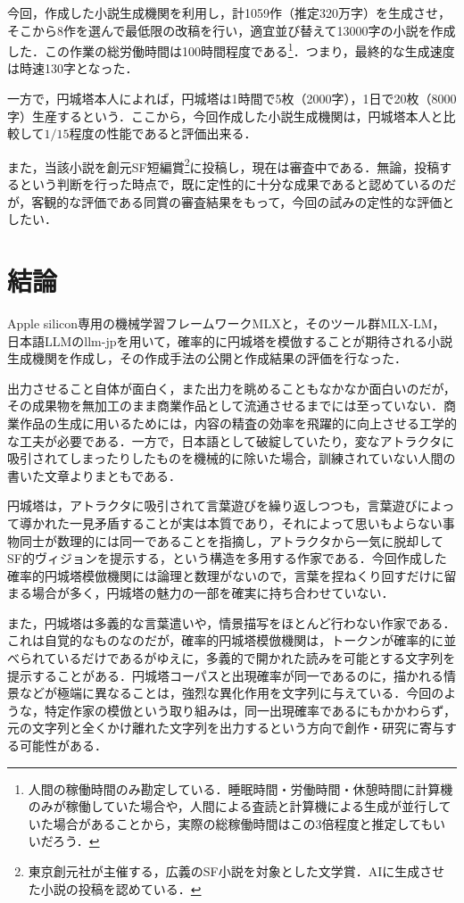 \documentclass[10pt, a5paper, twoside]{jsarticle}
\theoremstyle{definition}
\begin{document}
			今回，作成した小説生成機関を利用し，計1059作（推定320万字）を生成させ，そこから8作を選んで最低限の改稿を行い，適宜並び替えて13000字の小説を作成した．この作業の総労働時間は100時間程度である\footnote{人間の稼働時間のみ勘定している．睡眠時間・労働時間・休憩時間に計算機のみが稼働していた場合や，人間による査読と計算機による生成が並行していた場合があることから，実際の総稼働時間はこの3倍程度と推定してもいいだろう．}．つまり，最終的な生成速度は時速130字となった．
			
			一方で，円城塔本人によれば，円城塔は1時間で5枚（2000字），1日で20枚（8000字）生産するという\cite{ejt}．ここから，今回作成した小説生成機関は，円城塔本人と比較して$1/15$程度の性能であると評価出来る．

			また，当該小説を創元SF短編賞\footnote{東京創元社が主催する，広義のSF小説を対象とした文学賞．AIに生成させた小説の投稿を認めている．}に投稿し，現在は審査中である．無論，投稿するという判断を行った時点で，既に定性的に十分な成果であると認めているのだが，客観的な評価である同賞の審査結果をもって，今回の試みの定性的な評価としたい．

	\section{結論}

		Apple silicon専用の機械学習フレームワークMLXと，そのツール群MLX-LM，日本語LLMのllm-jpを用いて，確率的に円城塔を模倣することが期待される小説生成機関を作成し，その作成手法の公開と作成結果の評価を行なった．

		出力させること自体が面白く，また出力を眺めることもなかなか面白いのだが，その成果物を無加工のまま商業作品として流通させるまでには至っていない．商業作品の生成に用いるためには，内容の精査の効率を飛躍的に向上させる工学的な工夫が必要である．一方で，日本語として破綻していたり，変なアトラクタに吸引されてしまったりしたものを機械的に除いた場合，訓練されていない人間の書いた文章よりまともである．

		円城塔は，アトラクタに吸引されて言葉遊びを繰り返しつつも，言葉遊びによって導かれた一見矛盾することが実は本質であり，それによって思いもよらない事物同士が数理的には同一であることを指摘し，アトラクタから一気に脱却してSF的ヴィジョンを提示する，という構造を多用する作家である．今回作成した確率的円城塔模倣機関には論理と数理がないので，言葉を捏ねくり回すだけに留まる場合が多く，円城塔の魅力の一部を確実に持ち合わせていない．

		また，円城塔は多義的な言葉遣いや，情景描写をほとんど行わない作家である．これは自覚的なものなのだが，確率的円城塔模倣機関は，トークンが確率的に並べられているだけであるがゆえに，多義的で開かれた読みを可能とする文字列を提示することがある．円城塔コーパスと出現確率が同一であるのに，描かれる情景などが極端に異なることは，強烈な異化作用を文字列に与えている．今回のような，特定作家の模倣という取り組みは，同一出現確率であるにもかかわらず，元の文字列と全くかけ離れた文字列を出力するという方向で創作・研究に寄与する可能性がある．
\end{document}
